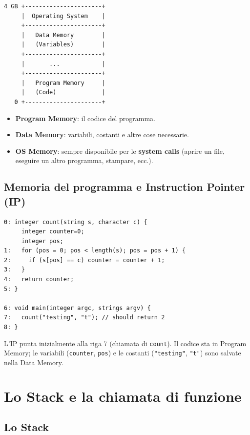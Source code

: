 \begin{verbatim}
4 GB +----------------------+
     |  Operating System    |
     +----------------------+
     |   Data Memory        |
     |   (Variables)        |
     +----------------------+
     |       ...            |
     +----------------------+
     |   Program Memory     |
     |   (Code)             |
   0 +----------------------+
\end{verbatim}

\begin{itemize}
  \item \textbf{Program Memory}: il codice del programma.
  \item \textbf{Data Memory}: variabili, costanti e altre cose necessarie.
  \item \textbf{OS Memory}: sempre disponibile per le \textbf{system calls} (aprire un file, eseguire un altro programma, stampare, ecc.).
\end{itemize}

\subsection{Memoria del programma e Instruction Pointer (IP)}


\begin{verbatim}
0: integer count(string s, character c) {
     integer counter=0;
     integer pos;
1:   for (pos = 0; pos < length(s); pos = pos + 1) {
2:     if (s[pos] == c) counter = counter + 1;
3:   }
4:   return counter;
5: }

6: void main(integer argc, strings argv) {
7:   count("testing", "t"); // should return 2
8: }
\end{verbatim}

L'IP punta inizialmente alla riga 7 (chiamata di \texttt{count}). Il codice sta in Program Memory; le variabili (\texttt{counter}, \texttt{pos}) e le costanti (\texttt{"testing"}, \texttt{"t"}) sono salvate nella Data Memory.

\section{Lo Stack e la chiamata di funzione}

\subsection{Lo Stack}

